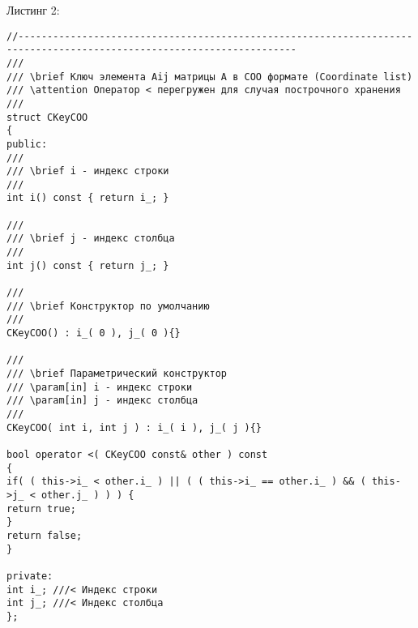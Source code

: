 \newpage
Листинг 2:

\begin{lstlisting}
//----------------------------------------------------------------------------------------------------------------------
///
/// \brief Ключ элемента Aij матрицы A в COO формате (Coordinate list)
/// \attention Оператор < перегружен для случая построчного хранения
///
struct CKeyCOO
{
public:
///
/// \brief i - индекс строки
///
int i() const { return i_; }

///
/// \brief j - индекс столбца
///
int j() const { return j_; }

///
/// \brief Конструктор по умолчанию
///
CKeyCOO() : i_( 0 ), j_( 0 ){}

///
/// \brief Параметрический конструктор
/// \param[in] i - индекс строки
/// \param[in] j - индекс столбца
///
CKeyCOO( int i, int j ) : i_( i ), j_( j ){}

bool operator <( CKeyCOO const& other ) const
{
if( ( this->i_ < other.i_ ) || ( ( this->i_ == other.i_ ) && ( this->j_ < other.j_ ) ) ) {
return true;
}
return false;
}

private:
int i_; ///< Индекс строки
int j_; ///< Индекс столбца
};
\end{lstlisting}



